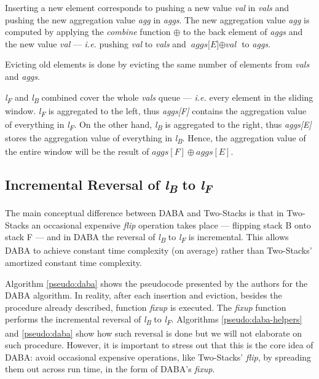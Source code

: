 Inserting a new element corresponds to pushing a new value \textit{val} in \textit{vals} and pushing the new aggregation value \textit{agg} in \textit{aggs}. The new aggregation value \textit{agg} is computed by applying the \textit{combine} function $\oplus$ to the back element of \textit{aggs} and the new value \textit{val} --- \textit{i.e.} pushing \textit{val} to \textit{vals} and $\textit{aggs[E]} \oplus \textit{val}$ to \textit{aggs}. 

Evicting old elements is done by evicting the same number of elements from \textit{vals} and \textit{aggs}.

\textit{l\textsubscript{F}} and \textit{l\textsubscript{B}} combined cover the whole \textit{vals} queue --- \textit{i.e.} every element in the sliding window. \textit{l\textsubscript{F}} is aggregated to the left, thus \textit{aggs[F]} contains the aggregation value of everything in \textit{l\textsubscript{F}}. On the other hand, \textit{l\textsubscript{B}} is aggregated to the right, thus \textit{aggs[E]} stores the aggregation value of everything in \textit{l\textsubscript{B}}. Hence, the aggregation value of the entire window will be the result of \textit{$aggs[F] \oplus aggs[E]$}.


\subsection*{Incremental Reversal of \textit{l\textsubscript{B}} to \textit{l\textsubscript{F}}}

The main conceptual difference between DABA and Two-Stacks is that in Two-Stacks an occasional expensive \textit{flip} operation takes place --- flipping stack B onto stack F --- and in DABA the reversal of \textit{l\textsubscript{B}} to \textit{l\textsubscript{F}} is incremental. This allows DABA to achieve constant time complexity (on average) rather than Two-Stacks' amortized constant time complexity.

Algorithm \ref{pseudo:daba} shows the pseudocode presented by the authors for the DABA algorithm. In reality, after each insertion and eviction, besides the procedure already described, function \textit{fixup} is executed. The \textit{fixup} function performs the incremental reversal of \textit{l\textsubscript{B}} to \textit{l\textsubscript{F}}. Algorithms \ref{pseudo:daba-helpers} and \ref{pseudo:daba} show how such reversal is done but we will not elaborate on such procedure. However, it is important to stress out that this is the core idea of DABA: avoid occasional expensive operations, like Two-Stacks' \textit{flip}, by spreading them out across run time, in the form of DABA's \textit{fixup}.

